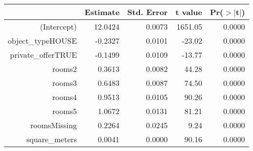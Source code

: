 \begin{table}[ht]
\centering
\begin{tabular}{rrrrr}
  \hline
 & Estimate & Std. Error & t value & Pr($>$$|$t$|$) \\ 
  \hline
(Intercept) & 12.0424 & 0.0073 & 1651.05 & 0.0000 \\ 
  object\_typeHOUSE & -0.2327 & 0.0101 & -23.02 & 0.0000 \\ 
  private\_offerTRUE & -0.1499 & 0.0109 & -13.77 & 0.0000 \\ 
  rooms2 & 0.3613 & 0.0082 & 44.28 & 0.0000 \\ 
  rooms3 & 0.6483 & 0.0087 & 74.50 & 0.0000 \\ 
  rooms4 & 0.9513 & 0.0105 & 90.26 & 0.0000 \\ 
  rooms5 & 1.0672 & 0.0131 & 81.21 & 0.0000 \\ 
  roomsMissing & 0.2264 & 0.0245 & 9.24 & 0.0000 \\ 
  square\_meters & 0.0041 & 0.0000 & 90.16 & 0.0000 \\ 
   \hline
\end{tabular}
\end{table}
